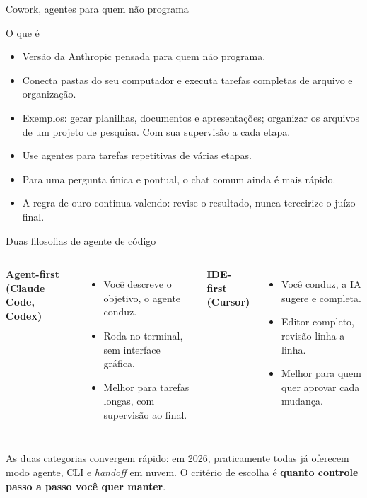 \documentclass[11pt,aspectratio=169,t]{beamer}
\begin{document}
\begin{frame}{Cowork, agentes para quem não programa}
  \small
  \begin{block}{O que é}
    \begin{itemize}
      \item Versão da Anthropic pensada para quem não programa.
      \item Conecta pastas do seu computador e executa tarefas completas de arquivo e organização.
      \item Exemplos: gerar planilhas, documentos e apresentações; organizar os arquivos de um projeto de pesquisa. Com sua supervisão a cada etapa.
    \end{itemize}
  \end{block}
  \pause
  \vfill
  \begin{exampleblock}{}
    \begin{itemize}
      \item Use agentes para tarefas repetitivas de várias etapas.
      \item Para uma pergunta única e pontual, o chat comum ainda é mais rápido.
      \item A regra de ouro continua valendo: revise o resultado, nunca terceirize o juízo final.
    \end{itemize}
  \end{exampleblock}
\end{frame}

\begin{frame}{Duas filosofias de agente de código}
  \small
  \begin{columns}[t]
    \textbf{\color{azulUNI}Agent-first (Claude Code, Codex)}
    \begin{itemize}
      \item Você descreve o objetivo, o agente conduz.
      \item Roda no terminal, sem interface gráfica.
      \item Melhor para tarefas longas, com supervisão ao final.
    \end{itemize}
    \textbf{\color{azulUNI}IDE-first (Cursor)}
    \begin{itemize}
      \item Você conduz, a IA sugere e completa.
      \item Editor completo, revisão linha a linha.
      \item Melhor para quem quer aprovar cada mudança.
    \end{itemize}
  \end{columns}
  \pause
  \vfill
  \begin{block}{}
    \centering As duas categorias convergem rápido: em 2026, praticamente todas já oferecem modo agente, CLI e \textit{handoff} em nuvem. O critério de escolha é \textbf{quanto controle passo a passo você quer manter}.
  \end{block}
\end{frame}
\end{document}
